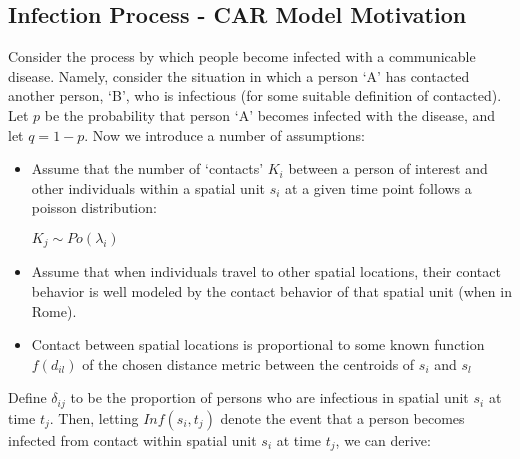 \documentclass[12pt]{article}
\begin{document}
\subsection{Infection Process - CAR Model Motivation}

Consider the process by which people become infected with a communicable disease. 
Namely, consider the situation in which a person `A' has contacted another person, `B', 
who is infectious (for some suitable definition of contacted). 
Let $p$ be the probability that person `A' becomes infected with the disease, and
let $q=1-p$. Now we introduce a number of assumptions:

\begin{itemize}

    \item Assume that the number of `contacts' $K_i$ between a person of interest 
    and other individuals within a spatial unit $s_i$ at a given time point follows a poisson 
    distribution:\\
    \begin{center}
        $K_j \sim Po(\lambda_i)$
    \end{center}
    \item Assume that when individuals travel to other spatial locations, their 
        contact behavior is well modeled by the contact behavior of that spatial unit (when in Rome).  
    \item Contact between spatial locations is proportional to some known function $f(d_{il})$
        of the chosen distance metric between the centroids of $s_i$ and $s_l$
\end{itemize}

Define $\delta_{ij}$ to be the proportion of persons who are infectious in spatial unit $s_i$ 
at time $t_j$. Then, letting $Inf(s_i, t_j)$ denote the event that a person becomes 
infected from contact within spatial unit $s_i$ at time $t_j$, we can derive:
\end{document}
